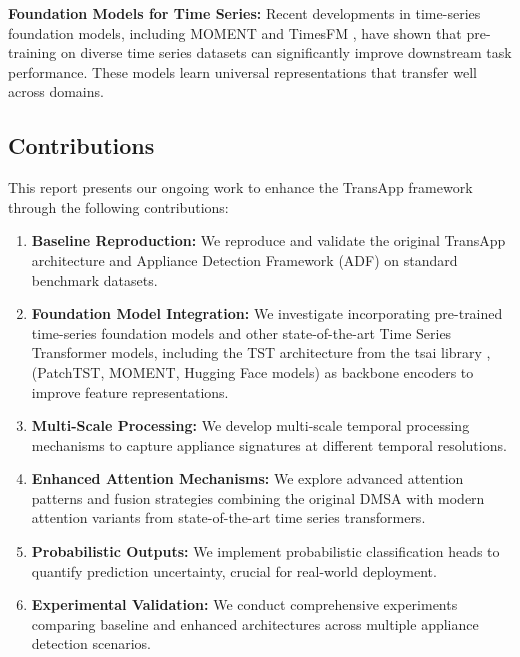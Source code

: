 \documentclass[conference]{IEEEtran}
\begin{document}
\textbf{Foundation Models for Time Series:} Recent developments in time-series foundation models, including MOMENT \cite{moment2024} and TimesFM \cite{timesfm2024}, have shown that pre-training on diverse time series datasets can significantly improve downstream task performance. These models learn universal representations that transfer well across domains.

\subsection{Contributions}

This report presents our ongoing work to enhance the TransApp framework through the following contributions:

\begin{enumerate}
    \item \textbf{Baseline Reproduction:} We reproduce and validate the original TransApp architecture and Appliance Detection Framework (ADF) on standard benchmark datasets.
    
    \item \textbf{Foundation Model Integration:} We investigate incorporating pre-trained time-series foundation models and other state-of-the-art Time Series Transformer models, including the TST architecture from the tsai library \cite{tsai2022, tst2022tsai}, (PatchTST, MOMENT, Hugging Face models) as backbone encoders to improve feature representations.
    
    \item \textbf{Multi-Scale Processing:} We develop multi-scale temporal processing mechanisms to capture appliance signatures at different temporal resolutions.
    
    \item \textbf{Enhanced Attention Mechanisms:} We explore advanced attention patterns and fusion strategies combining the original DMSA with modern attention variants from state-of-the-art time series transformers.
    
    \item \textbf{Probabilistic Outputs:} We implement probabilistic classification heads to quantify prediction uncertainty, crucial for real-world deployment.
    
    \item \textbf{Experimental Validation:} We conduct comprehensive experiments comparing baseline and enhanced architectures across multiple appliance detection scenarios.
\end{enumerate}
\end{document}
